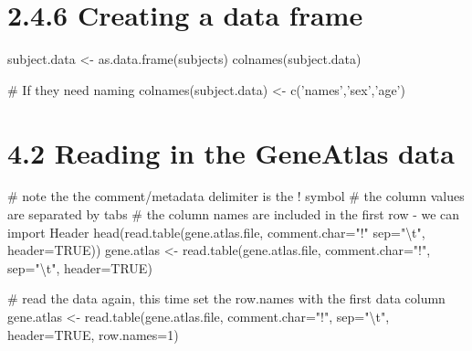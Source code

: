 \documentclass[a4paper]{book}
\newenvironment{Shaded}{}{}
\newcommand{\KeywordTok}[1]{\textcolor[rgb]{0.00,0.00,1.00}{{#1}}}
\newcommand{\DataTypeTok}[1]{{#1}}
\newcommand{\DecValTok}[1]{{#1}}
\newcommand{\CharTok}[1]{\textcolor[rgb]{0.00,0.50,0.50}{{#1}}}
\newcommand{\StringTok}[1]{\textcolor[rgb]{0.00,0.50,0.50}{{#1}}}
\newcommand{\CommentTok}[1]{\textcolor[rgb]{0.00,0.50,0.00}{{#1}}}
\newcommand{\OtherTok}[1]{\textcolor[rgb]{1.00,0.25,0.00}{{#1}}}
\newcommand{\NormalTok}[1]{{#1}}
\newlength{\leftbarwidth}
\newlength{\leftbarsep}
\newcommand*{\leftbarcolorcmd}{\color{darkgray}}%
\renewenvironment{leftbar}{%
    \def\FrameCommand{{\leftbarcolorcmd{\vrule width \leftbarwidth\relax\hspace {\leftbarsep}}}}%
    \MakeFramed {\advance \hsize -\width \FrameRestore }%
}{%
    \endMakeFramed
}
\renewenvironment{Shaded}
{\vspace{0em}\begin{leftbar}\begin{snugshade}}
{\end{snugshade}\end{leftbar}\vspace{0pt}}
\begin{document}
\section*{2.4.6 Creating a data frame}\label{creating-a-data-frame}

\begin{Shaded}
\begin{Highlighting}[]
\NormalTok{subject.data <-}\StringTok{ }\KeywordTok{as.data.frame}\NormalTok{(subjects)}
\KeywordTok{colnames}\NormalTok{(subject.data)}

\CommentTok{# If they need naming}
\KeywordTok{colnames}\NormalTok{(subject.data) <-}\StringTok{ }\KeywordTok{c}\NormalTok{(}\StringTok{'names'}\NormalTok{,}\StringTok{'sex'}\NormalTok{,}\StringTok{'age'}\NormalTok{)}
\end{Highlighting}
\end{Shaded}

\section*{4.2 Reading in the GeneAtlas
data}\label{reading-in-the-geneatlas-data}

\begin{Shaded}
\begin{Highlighting}[]
\CommentTok{# note the the comment/metadata delimiter is the ! symbol}
\CommentTok{# the column values are separated by tabs}
\CommentTok{# the column names are included in the first row - we can import Header}
\KeywordTok{head}\NormalTok{(}\KeywordTok{read.table}\NormalTok{(gene.atlas.file, }\DataTypeTok{comment.char=}\StringTok{"!"} \DataTypeTok{sep=}\StringTok{"}\CharTok{\textbackslash{}t}\StringTok{"}\NormalTok{, }\DataTypeTok{header=}\OtherTok{TRUE}\NormalTok{))}
\NormalTok{gene.atlas <-}\StringTok{ }\KeywordTok{read.table}\NormalTok{(gene.atlas.file, }\DataTypeTok{comment.char=}\StringTok{"!"}\NormalTok{, }\DataTypeTok{sep=}\StringTok{"}\CharTok{\textbackslash{}t}\StringTok{"}\NormalTok{, }\DataTypeTok{header=}\OtherTok{TRUE}\NormalTok{)}

\CommentTok{# read the data again, this time set the row.names with the first data column}
\NormalTok{gene.atlas <-}\StringTok{ }\KeywordTok{read.table}\NormalTok{(gene.atlas.file, }\DataTypeTok{comment.char=}\StringTok{"!"}\NormalTok{, }\DataTypeTok{sep=}\StringTok{"}\CharTok{\textbackslash{}t}\StringTok{"}\NormalTok{,}
                         \DataTypeTok{header=}\OtherTok{TRUE}\NormalTok{, }\DataTypeTok{row.names=}\DecValTok{1}\NormalTok{)}
\end{Highlighting}
\end{Shaded}
\end{document}
